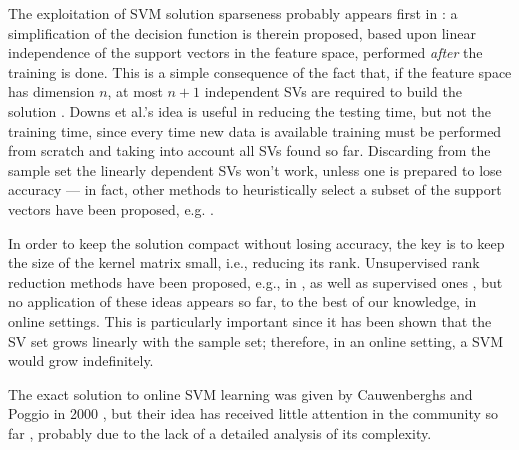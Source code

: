 The exploitation of SVM solution sparseness probably appears first in
\cite{DownsGM01}: a simplification of the decision function is therein
proposed, based upon linear independence of the support vectors in the
feature space, performed \emph{after} the training is done. This is a
simple consequence of the fact that, if the feature space has
dimension $n$, at most $n+1$ independent SVs are required to build the
solution \cite{PontilV98}. Downs et al.'s idea is useful in reducing
the testing time, but not the training time, since every time new data
is available training must be performed from scratch and taking into
account all SVs found so far. Discarding from the sample set the
linearly dependent SVs won't work, unless one is prepared to lose
accuracy --- in fact, other methods to heuristically select a subset
of the support vectors have been proposed,
e.g. \cite{LeeM01,schoel06,KeerthiCDC06}.

In order to keep the solution compact without losing accuracy, the key
is to keep the size of the kernel matrix small, i.e., reducing its
rank. Unsupervised rank reduction methods have been proposed, e.g., in
\cite{KeerthiCDC06}, as well as supervised ones
\cite{Baudat03,BachJordan2005}, but no application of these ideas
appears so far, to the best of our knowledge, in online settings. This
is particularly important since it has been shown \cite{Steinwart03}
that the SV set grows linearly with the sample set; therefore, in an
online setting, a SVM would grow indefinitely.

The exact solution to online SVM learning was given by Cauwenberghs
and Poggio in 2000 \cite{CauwenberghsP00}, but their idea has received
little attention in the community so far \cite{Laskov2006}, probably
due to the lack of a detailed analysis of its complexity.
